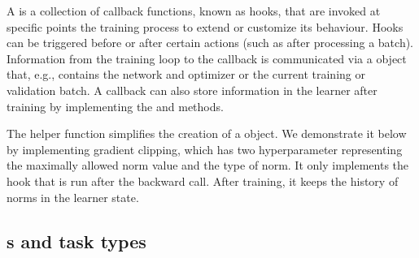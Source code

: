 \documentclass[article]{jss}
\theoremstyle{definition}
\begin{document}
A  is a collection of callback functions, known as hooks, that are invoked at specific points the training process to extend or customize its behaviour.
Hooks can be triggered before or after certain actions (such as after processing a batch).
Information from the training loop to the callback is communicated via a  object that, e.g., contains the network and optimizer or the current training or validation batch.
A callback can also store information in the learner after training by implementing the  and  methods.

The  helper function simplifies the creation of a  object.
We demonstrate it below by implementing gradient clipping, which has two hyperparameter representing the maximally allowed norm value and the type of norm.
It only implements the hook that is run after the backward call.
After training, it keeps the history of norms in the learner state.



\subsection[Learners and task types]{s and task types}\label{sec:extending-learner-task}
\end{document}
